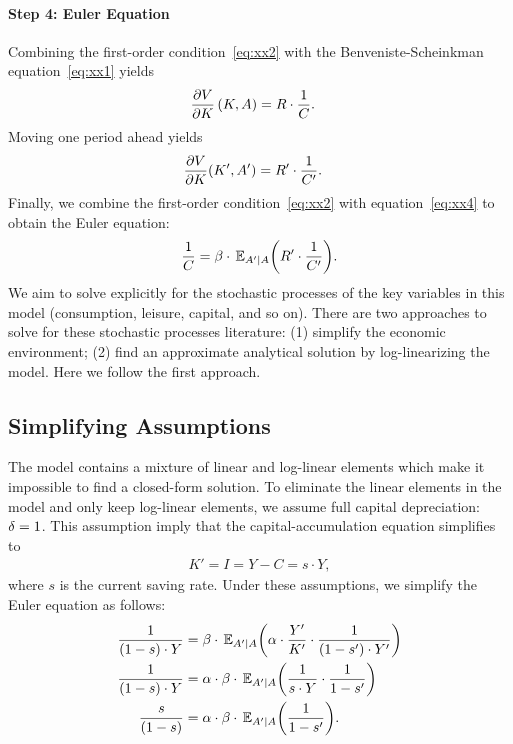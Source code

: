 \documentclass[letterpaper,12pt,leqno]{article}
\begin{document}
\paragraph{Step 4: Euler Equation} Combining the first-order condition~\eqref{eq:xx2} with the Benveniste-Scheinkman equation~\eqref{eq:xx1} yields
\begin{align*}
\frac{\partial V}{\partial K}\left( K,A \right)   &  = R \cdot \frac{1}{C}.
\end{align*}
Moving one period ahead yields
\begin{align}
\frac{\partial V}{\partial K}(K',A')   &  =  R' \cdot  \frac{1}{C'}.\label{eq:xx4}
\end{align}
Finally, we combine the first-order condition~\eqref{eq:xx2} with equation~\eqref{eq:xx4} to obtain the Euler equation:
\begin{equation}
\frac{1}{C}=\b \cdot \E[A'|A]{R'\cdot\frac{1}{C'}}.\label{eq:euler}
\end{equation}
We aim to solve explicitly for the stochastic processes of the key variables in this model (consumption, leisure, capital, and so on). There are two approaches to solve for these stochastic processes literature: (1) simplify the economic environment; (2) find an approximate analytical solution by log-linearizing the model. Here we follow the first approach.

\subsection{Simplifying Assumptions}

The model contains a mixture of linear and log-linear elements which make it impossible to find a closed-form solution. To eliminate the linear elements in the model and only keep log-linear elements, we assume full capital depreciation: $\delta=1$. This assumption imply that the capital-accumulation equation simplifies to
\begin{align*}
K'=I=Y-C=s\cdot Y,
\end{align*}
where $s$ is the current saving rate. Under these assumptions, we simplify the Euler equation as follows:
\begin{align*}
\frac{1}{\bp{1-s}\cdot Y}&=\b\cdot \E[A'|A]{\a\cdot \frac{Y'}{K'}\cdot \frac{1}{\bp{1-s'} \cdot  Y'}}\\
\frac{1}{\bp{1-s}\cdot Y}&=\a\cdot \b\cdot \E[A'|A]{\frac{1}{s\cdot Y}\cdot \frac{1}{1-s'}} \\
\frac{s}{\bp{1-s} }  &  =\a\cdot \b\cdot \E[A'|A]{  \frac{1}{1-s'}}.
\end{align*}
\end{document}

